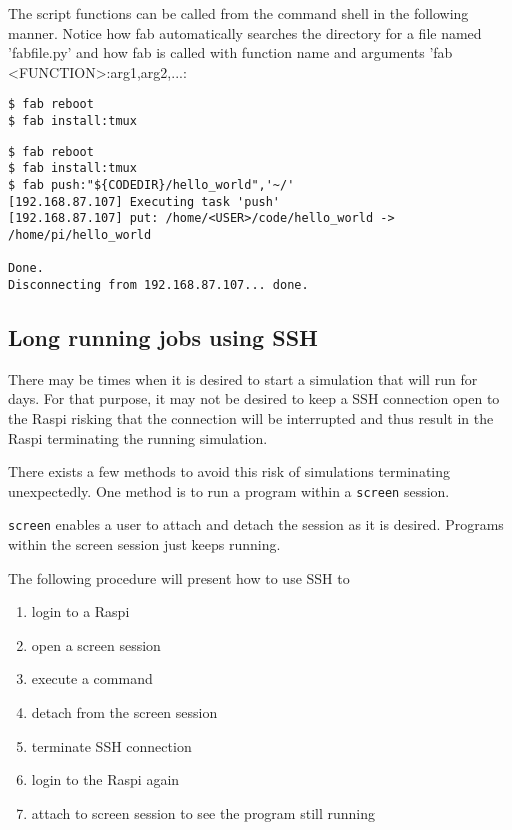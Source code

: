 The script functions can be called from the command shell in the following
manner. Notice how fab automatically searches the directory for a file 
named 'fabfile.py' and how fab is called with function name and arguments
'fab <FUNCTION>:arg1,arg2,...:
\begin{lstlisting}[]
$ fab reboot
$ fab install:tmux
\end{lstlisting}
\FloatBarrier
\vspace{-5mm}

\begin{lstlisting}[]
$ fab reboot
$ fab install:tmux
$ fab push:"${CODEDIR}/hello_world",'~/'
[192.168.87.107] Executing task 'push'
[192.168.87.107] put: /home/<USER>/code/hello_world -> /home/pi/hello_world

Done.
Disconnecting from 192.168.87.107... done.
\end{lstlisting}
\FloatBarrier
\vspace{-5mm}






\subsection{Long running jobs using SSH}

There may be times when it is desired to start a simulation that will
run for days. For that purpose, it may not be desired to keep
a \ac{SSH} connection open to the \ac{Raspi} risking that the connection
will be interrupted and thus result in the \ac{Raspi} terminating
the running simulation.

There exists a few methods to avoid this risk of simulations terminating
unexpectedly. One method is to run a program within a \texttt{screen} session.

\texttt{screen} enables a user to attach and detach the session as it is
desired. Programs within the screen session just keeps running.

The following procedure will present how to use SSH to
\begin{enumerate}
    \item login to a \ac{Raspi}
    \item open a screen session
    \item execute a command
    \item detach from the screen session
    \item terminate SSH connection
    \item login to the \ac{Raspi} again
    \item attach to screen session to see the program still running
\end{enumerate}

